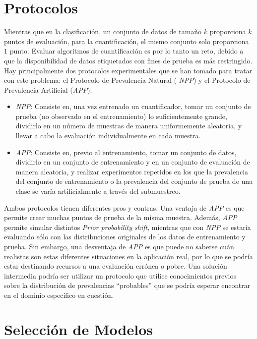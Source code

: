 \section{Protocolos}\label{evaluacion:protocolos}

Mientras que en la clasificación, un conjunto de datos de tamaño $k$ proporciona
$k$ puntos de evaluación, para la cuantificación, el mismo conjunto solo
proporciona $1$ punto. Evaluar algoritmos de cuantificación es por lo tanto un
reto, debido a que la disponibilidad de datos etiquetados con fines de prueba es
más restringido. Hay principalmente dos protocolos experimentales que se han
tomado para tratar con este problema: el Protocolo de Prevalencia Natural ({\it
NPP\/}) y el Protocolo de Prevalencia Artificial ({\it APP\/}).

\begin{itemize}
    \item {\it NPP\/}: Consiste en, una vez entrenado un cuantificador, tomar un
    conjunto de prueba (no observado en el entrenamiento) lo suficientemente
    grande, dividirlo en un número de muestras de manera uniformemente
    aleatoria, y llevar a cabo la evaluación individualmente en cada muestra.
    \item {\it APP\/}: Consiste en, previo al entrenamiento, tomar un conjunto
    de datos, dividirlo en un conjunto de entrenamiento y en un conjunto de
    evaluación de manera aleatoria, y realizar experimentos repetidos en los que
    la prevalencia del conjunto de entrenamiento o la prevalencia del conjunto
    de prueba de una clase se varía artificialmente a través del submuestreo.
\end{itemize}

Ambos protocolos tienen diferentes pros y contras. Una ventaja de {\it APP\/} es
que permite crear muchas puntos de prueba de la misma muestra. Además, {\it
APP\/} permite simular distintos {\it Prior probability shift}, mientras que con
{\it NPP\/} se estaría evaluando sólo con las distribuciones originales de los
datos de entrenamiento y prueba. Sin embargo, una desventaja de {\it APP\/} es
que puede no saberse cuán realistas son estas diferentes situaciones en la
aplicación real, por lo que se podría estar destinando recursos a una evaluación
errónea o pobre. Una solución intermedia podría ser utilizar un protocolo que
utilice conocimientos previos sobre la distribución de prevalencias “probables”
que se podría esperar encontrar en el dominio específico en cuestión.

\section{Selección de Modelos}\label{evaluacion:seleccion}

